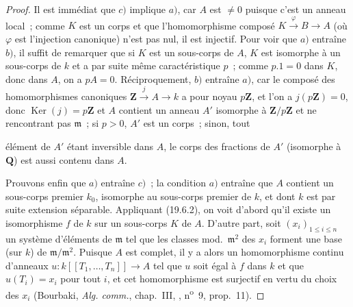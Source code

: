 \begin{proof}
Il est immédiat que $c)$ implique $a)$, car $A$ est $\neq0$ puisque c'est un
anneau local~; comme $K$ est un corps et que l'homomorphisme composé
$K\xrightarrow{\varphi}B\to A$ (où $\varphi$ est l'injection canonique) n'est
pas nul, il est injectif. Pour voir que $a)$ entraîne $b)$, il suffit de
remarquer que si $K$ est un sous-corps de $A$, $K$ est isomorphe à un
sous-corps de $k$ et a par suite même caractéristique $p$~; comme $p.1=0$ dans
$K$, donc dans $A$, on a $pA=0$. Réciproquement, $b)$ entraîne $a)$, car le
composé des homomorphismes canoniques
$\mathbf Z\xrightarrow{j}A\to k$ a pour noyau $p\mathbf Z$, et l'on a
$j(p\mathbf Z)=0$, donc $\operatorname{Ker}(j)=p\mathbf Z$ et $A$ contient un
anneau $A'$ isomorphe à $\mathbf Z/p\mathbf Z$ et ne rencontrant pas
$\mathfrak m$~; si $p>0$, $A'$ est un corps~; sinon, tout


élément de $A'$ étant inversible dans $A$, le corps des fractions de $A'$
(isomorphe à $\mathbf Q$) est aussi contenu dans $A$.

Prouvons enfin que $a)$ entraîne $c)$~; la condition $a)$ entraîne que $A$
contient un sous-corps premier $k_0$, isomorphe au sous-corps premier de $k$,
et dont $k$ est par suite extension séparable. Appliquant (19.6.2), on voit
d'abord qu'il existe un isomorphisme $f$ de $k$ sur un sous-corps $K$ de $A$.
D'autre part, soit $(x_i)_{1\leq i\leq n}$ un système d'éléments de
$\mathfrak m$ tel que les classes mod.~$\mathfrak m^2$ des $x_i$ forment une
base (sur $k$) de $\mathfrak m/\mathfrak m^2$. Puisque $A$ est complet, il y a
alors un homomorphisme continu d'anneaux
$u:k[[T_1,\ldots,T_n]]\to A$ tel que $u$ soit égal à $f$ dans $k$ et que
$u(T_i)=x_i$ pour tout $i$, et cet homomorphisme est surjectif en vertu du
choix des $x_i$ (Bourbaki, \emph{Alg. comm.}, chap.~III, ,
n\textsuperscript{o}~9, prop.~11).
\end{proof}

